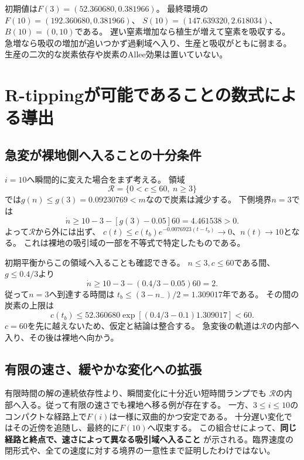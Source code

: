 \documentclass[a4paper,11pt]{ltjsarticle}
\begin{document}
初期値は$F(3)=(52.360680,0.381966)$。
最終環境の$F(10)=(192.360680,0.381966)$、
$S(10)=(147.639320,2.618034)$、$B(10)=(0,10)$である。
遅い窒素増加なら植生が増えて窒素を吸収する。
急増なら吸収の増加が追いつかず過剰域へ入り、生産と吸収がともに弱まる。
生産の二次的な炭素依存や炭素のAllee効果は置いていない。

\section{R-tippingが可能であることの数式による導出}
\subsection{急変が裸地側へ入ることの十分条件}
$i=10$へ瞬間的に変えた場合をまず考える。
領域
\begin{equation}\mathcal R=\{0<c\leq60,\ n\geq3\}\end{equation}
では$g(n)\leq g(3)=0.09230769<m$なので炭素は減少する。
下側境界$n=3$では
\begin{equation}
\dot n\geq10-3-[g(3)-0.05]60=4.461538>0.
\end{equation}
よって$\mathcal R$から外には出ず、
$c(t)\leq c(t_b)e^{-0.0076923(t-t_b)}\to0$、$n(t)\to10$となる。
これは裸地の吸引域の一部を不等式で特定したものである。

初期平衡からこの領域へ入ることも確認できる。
$n\leq3,c\leq60$である間、$g\leq0.4/3$より
\begin{equation}
\dot n\geq 10-3-(0.4/3-0.05)60=2.
\end{equation}
従って$n=3$へ到達する時間は
$t_b\leq(3-n_-)/2=1.309017$年である。
その間の炭素の上限は
\begin{equation}
c(t_b)\leq52.360680\exp[(0.4/3-0.1)1.309017]<60.
\end{equation}
$c=60$を先に越えないため、仮定と結論は整合する。
急変後の軌道は$\mathcal R$の内部へ入り、その後は裸地へ向かう。

\subsection{有限の速さ、緩やかな変化への拡張}
有限時間の解の連続依存性より、瞬間変化に十分近い短時間ランプでも
$\mathcal R$の内部へ入る。従って有限の速さでも裸地へ移る例が存在する。
一方、$3\leq i\leq10$のコンパクトな経路上で$F(i)$は一様に双曲的かつ安定である。
十分遅い変化ではその近傍を追随し、最終的に$F(10)$へ収束する。
この組合せによって、\textbf{同じ経路と終点で、速さによって異なる吸引域へ入ること}
が示される。臨界速度の閉形式や、全ての速度に対する境界の一意性まで証明したわけではない。
\end{document}

